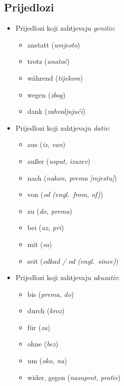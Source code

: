 \documentclass[12pt,german]{article}
\newcommand{\prijevod}[2]{\item #1 (\emph{#2})}
\begin{document}
\begin{multicols}{2}
\section{Prijedlozi}
\begin{itemize}
  \item Prijedlozi koji zahtjevaju \emph{genitiv}:
  \begin{itemize}[nolistsep, label={}]
      \prijevod{anstatt}{umjesto}
      \prijevod{trotz}{unatoč}
      \prijevod{w\"ahrend}{tijekom}
      \prijevod{wegen}{zbog}
      \prijevod{dank}{zahvaljujući}
  \end{itemize}

  \item Prijedlozi koji zahtjevaju \emph{dativ}:
  \begin{itemize}[nolistsep, label={}]
      \prijevod{aus}{iz, van}
      \prijevod{au{\ss}er}{usput, izuzev}
      \prijevod{nach}{nakon, prema [mjestu]}
      \prijevod{von}{od (engl.\ \emph{from, of})}
      \prijevod{zu}{do, prema}
      \prijevod{bei}{uz, pri}
      \prijevod{mit}{sa}
      \prijevod{seit}{odkad / od (engl.\ \emph{since})}
  \end{itemize}

  \item Prijedlozi koji zahtjevaju \emph{akuzativ}:
  \begin{itemize}[nolistsep, label={}]
      \prijevod{bis}{prema, do}
      \prijevod{durch}{kroz}
      \prijevod{f\"ur}{za}
      \prijevod{ohne}{bez}
      \prijevod{um}{oko, na}
      \prijevod{wider, gegen}{nasuprot, protiv}
  \end{itemize}
\end{itemize}

% 

\end{multicols}
\end{document}
